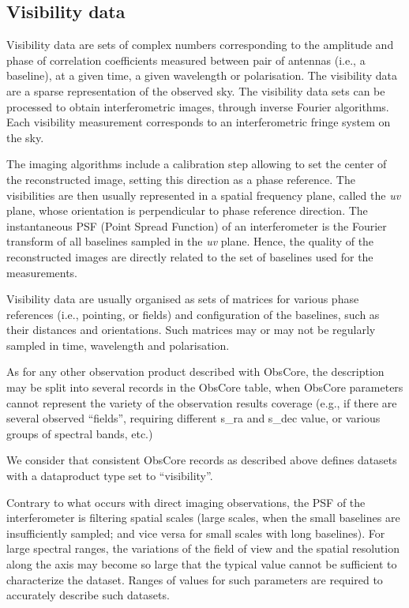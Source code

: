 \documentclass[11pt,a4paper]{ivoa}
\begin{document}
\subsection{Visibility data }
\label{sec:visibility}

Visibility data are sets of complex numbers corresponding to the amplitude and phase 
of correlation coefficients measured between pair of antennas (i.e., a baseline), at 
a given time, a given wavelength or polarisation. The visibility data are a sparse 
representation of the observed sky. The visibility data sets can be processed to obtain 
interferometric images, through inverse Fourier algorithms. Each visibility measurement 
corresponds to an interferometric fringe system on the sky. 

The imaging algorithms include a calibration step allowing to set the center of the 
reconstructed image, setting this direction as a phase reference. The visibilities
are then usually represented in a spatial frequency plane, called the \emph{uv} plane, 
whose orientation is perpendicular to phase reference direction. The instantaneous PSF 
(Point Spread Function) of an interferometer is the Fourier transform of all baselines 
sampled in the \emph{uv} plane. Hence, the quality of the reconstructed images are 
directly related to the set of baselines used for the measurements.

Visibility data are usually organised as sets of matrices for various phase references
(i.e., pointing, or fields) and configuration of the baselines, such as their
distances and orientations. Such matrices may or may not be regularly sampled in time, 
wavelength and polarisation.
    
As for any other observation product described with ObsCore, the description may be split into
several records in the ObsCore table, when ObsCore parameters cannot represent the 
variety of the observation results coverage (e.g., if there are several observed ``fields'', 
requiring different s\_ra and s\_dec value, or various groups of spectral bands, etc.) 

We consider that consistent ObsCore records as described above defines datasets with 
a dataproduct type set to ``visibility''.



Contrary to what occurs with direct imaging observations, the PSF of the interferometer
is filtering spatial scales (large scales, when the small baselines are insufficiently 
sampled; and vice versa for small scales with long baselines).
For large spectral ranges, the variations of the field of view and the spatial resolution 
along the axis may become so large that the typical value cannot be sufficient to 
characterize the dataset. Ranges of values for such parameters are required to accurately 
describe such datasets.
\end{document}
